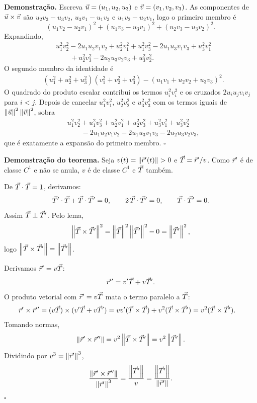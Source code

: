 \documentclass[11pt,a4paper]{article}
\begin{document}
\noindent\textbf{Demonstração.}
Escreva \(\vec{u}=(u_{1},u_{2},u_{3})\) e \(\vec{v}=(v_{1},v_{2},v_{3})\). As componentes de \(\vec{u}\times\vec{v}\) são \(u_{2}v_{3}-u_{3}v_{2}\), \(u_{3}v_{1}-u_{1}v_{3}\) e \(u_{1}v_{2}-u_{2}v_{1}\), logo o primeiro membro é
\[
(u_{1}v_{2}-u_{2}v_{1})^{2}+(u_{1}v_{3}-u_{3}v_{1})^{2}+(u_{2}v_{3}-u_{3}v_{2})^{2}.
\]
Expandindo,
\begin{align*}
&u_{1}^{2}v_{2}^{2}-2u_{1}u_{2}v_{1}v_{2}+u_{2}^{2}v_{1}^{2}
+u_{1}^{2}v_{3}^{2}-2u_{1}u_{3}v_{1}v_{3}+u_{3}^{2}v_{1}^{2}\\
&\qquad+u_{2}^{2}v_{3}^{2}-2u_{2}u_{3}v_{2}v_{3}+u_{3}^{2}v_{2}^{2}.
\end{align*}
O segundo membro da identidade é
\begin{align*}
&(u_{1}^{2}+u_{2}^{2}+u_{3}^{2})(v_{1}^{2}+v_{2}^{2}+v_{3}^{2})
-(u_{1}v_{1}+u_{2}v_{2}+u_{3}v_{3})^{2}.
\end{align*}
O quadrado do produto escalar contribui os termos \(u_{i}^{2}v_{i}^{2}\) e os cruzados \(2u_{i}u_{j}v_{i}v_{j}\) para \(i<j\). Depois de cancelar \(u_{1}^{2}v_{1}^{2}\), \(u_{2}^{2}v_{2}^{2}\) e \(u_{3}^{2}v_{3}^{2}\) com os termos iguais de \(\left\lVert \vec{u} \right\rVert^{2}\left\lVert \vec{v} \right\rVert^{2}\), sobra
\begin{align*}
&u_{1}^{2}v_{2}^{2}+u_{1}^{2}v_{3}^{2}+u_{2}^{2}v_{1}^{2}+u_{2}^{2}v_{3}^{2}+u_{3}^{2}v_{1}^{2}+u_{3}^{2}v_{2}^{2}\\
&\qquad-2u_{1}u_{2}v_{1}v_{2}-2u_{1}u_{3}v_{1}v_{3}-2u_{2}u_{3}v_{2}v_{3},
\end{align*}
que é exatamente a expansão do primeiro membro.
\hfill\(\square\)

\noindent\textbf{Demonstração do teorema.}
Seja \(v(t)=\left\lVert \vec{r}'(t) \right\rVert>0\) e \(\vec{T}=\vec{r}'/v\). Como \(\vec{r}'\) é de classe \(C^1\) e não se anula, \(v\) é de classe \(C^1\) e \(\vec{T}\) também.

De \(\vec{T}\cdot\vec{T}=1\), derivamos:
\[
\vec{T}'\cdot\vec{T}+\vec{T}\cdot\vec{T}'=0,
\qquad
2\,\vec{T}\cdot\vec{T}'=0,
\qquad
\vec{T}\cdot\vec{T}'=0.
\]
Assim \(\vec{T}\perp\vec{T}'\). Pelo lema,
\[
\left\lVert \vec{T}\times\vec{T}' \right\rVert^{2}
=\left\lVert \vec{T} \right\rVert^{2}\left\lVert \vec{T}' \right\rVert^{2}-0
=\left\lVert \vec{T}' \right\rVert^{2},
\]
logo \(\left\lVert \vec{T}\times\vec{T}' \right\rVert=\left\lVert \vec{T}' \right\rVert\).

Derivamos \(\vec{r}'=v\vec{T}\):
\[
\vec{r}''=v'\vec{T}+v\vec{T}'.
\]
O produto vetorial com \(\vec{r}'=v\vec{T}\) mata o termo paralelo a \(\vec{T}\):
\begin{align*}
\vec{r}'\times\vec{r}''
&=(v\vec{T})\times(v'\vec{T}+v\vec{T}')
=vv'(\vec{T}\times\vec{T})+v^{2}(\vec{T}\times\vec{T}')
=v^{2}(\vec{T}\times\vec{T}').
\end{align*}
Tomando normas,
\[
\left\lVert \vec{r}'\times\vec{r}'' \right\rVert
=v^{2}\left\lVert \vec{T}\times\vec{T}' \right\rVert
=v^{2}\left\lVert \vec{T}' \right\rVert.
\]
Dividindo por \(v^{3}=\left\lVert \vec{r}' \right\rVert^{3}\),
\[
\frac{\left\lVert \vec{r}'\times\vec{r}'' \right\rVert}{\left\lVert \vec{r}' \right\rVert^{3}}
=\frac{\left\lVert \vec{T}' \right\rVert}{v}
=\frac{\left\lVert \vec{T}' \right\rVert}{\left\lVert \vec{r}' \right\rVert}.
\]
\hfill\(\square\)
\end{document}
